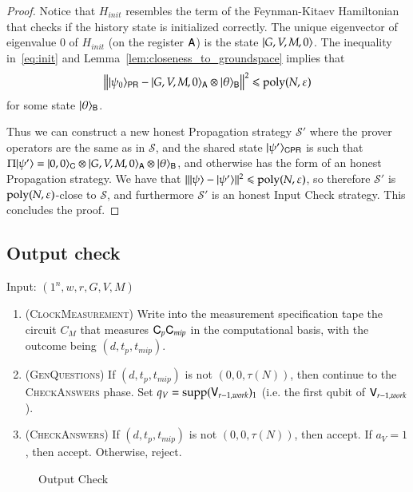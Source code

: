\begin{proof}
	Notice that $H_{init}$ resembles the term of the Feynman-Kitaev Hamiltonian that checks if the history state is initialized correctly. The unique eigenvector of eigenvalue $0$ of $H_{init}$ (on the register ${\mathsf{A}}$) is the state $|G,V,M,0\rangle$. The inequality in~\eqref{eq:init} and Lemma~\ref{lem:closeness_to_groundspace} implies that
	\[
		\left\lVert |\psi_0\rangle_{{\mathsf{P}} {\mathsf{R}}} - |G,V,M,0\rangle_{{\mathsf{A}}} \otimes |\theta\rangle_{{\mathsf{B}}} \right\rVert^2 \leqslant \operatorname{poly}(N,\varepsilon)
	\]
	for some state $|\theta\rangle_{{\mathsf{B}}}$.
	
	Thus we can construct a new honest Propagation strategy $\mathcal{S}'$ where the prover operators are the same as in $\mathcal{S}$, and the shared state $|\psi'\rangle_{{\mathsf{C}} {\mathsf{P}} {\mathsf{R}}}$ is such that $\Pi |\psi'\rangle = |0,0\rangle_{{\mathsf{C}}} \otimes |G,V,M,0\rangle_{{\mathsf{A}}} \otimes |\theta\rangle_{{\mathsf{B}}}$, and otherwise has the form of an honest Propagation strategy. We have that $\| |\psi\rangle - |\psi'\rangle \|^2 \leqslant \operatorname{poly}(N,\varepsilon)$, so therefore $\mathcal{S}'$ is $\operatorname{poly}(N,\varepsilon)$-close to $\mathcal{S}$, and furthermore $\mathcal{S}'$ is an honest Input Check strategy. This concludes the proof.
	

	

\end{proof}

\subsection{Output check}
\label{sec:output_check}


\vspace{10pt}
\begin{center}
\begin{mdframed}
    Input: $(1^n,w,r,G,V,M)$
	\begin{enumerate}
		\item (\textsc{ClockMeasurement}) Write into the measurement specification tape the circuit $C_M$ that measures ${\mathsf{C}}_p {\mathsf{C}}_{mip}$ in the computational basis, with the outcome being $(d,t_p,t_{mip})$.
		
		\item (\textsc{GenQuestions}) If $(d,t_p,t_{mip})$ is not $(0,0,\tau(N))$, then continue to the \textsc{CheckAnswers} phase. Set $q_V = \operatorname{supp}({\mathsf{V}}_{r-1,work})_1$ (i.e. the first qubit of ${\mathsf{V}}_{r-1,work}$).
		\item (\textsc{CheckAnswers}) If $(d,t_p,t_{mip})$ is not $(0,0,\tau(N))$, then accept. If $a_V = 1$, then accept. Otherwise, reject.
	\end{enumerate}    
\end{mdframed}
\end{center}
\begin{figure}[H]
\caption{Output Check}
\label{fig:output_check}
\end{figure}


